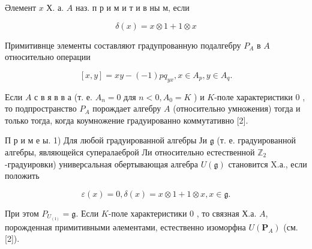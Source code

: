\documentclass[10pt]{article}
\begin{document}
Әлемент $x$ Х. а. $A$ наз. п р и м и т и в ны м, если



\[

\delta(x)=x \otimes 1+1 \otimes x

\]



Примитивнце элементы составляют градупрованную подалгебру $P_{A}$ в $A$ относительно операции



\[

[x, y]=x y-(-1) p q_{y x}, x \in A_{p}, y \in A_{q} .

\]



Если $A$ с в я в в а (т. е. $A_{n}=0$ для $n<0, A_{0}=K$ ) и $K$-поле характеристики 0 , то подпространство $P_{A}$ порождает алгебру $A$ (относительно умножения) тогда и только тогда, когда коумножение градуированно коммутативно [2].



П р и м е ы. 1) Для любой градуированной алгебры Ји $\mathfrak{g}$ (т. е. градуированной алгебры, являющейся супералаеброй Ли относительно естественной $\mathbb{Z}_{2}$-градуировки) универсальная обертывающая алгебра $U(\mathfrak{g})$ становится X.а., если положить



\[

\varepsilon(x)=0, \delta(x)=x \otimes 1+1 \otimes x, x \in \mathfrak{g} .

\]



При этом $P_{U_{(\mathfrak{l})}}=\mathfrak{g}$. Если $K$-поле характеристики 0 , то связная Х.а. $A$, порожденная примитивными әлементами, естественно изоморфна $U\left(\boldsymbol{P}_{A}\right)$ (см. [2]).
\end{document}
